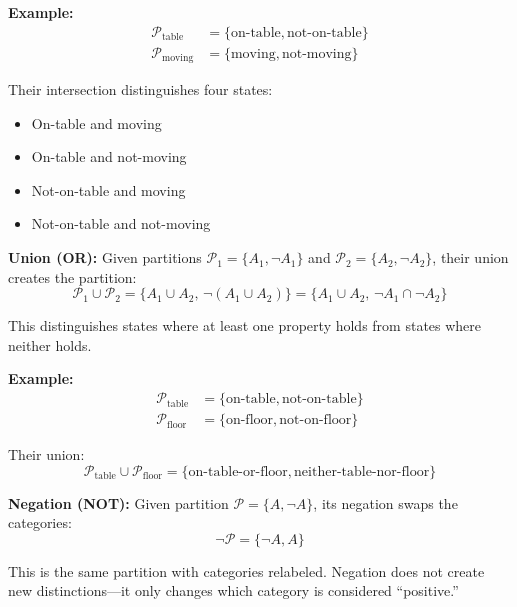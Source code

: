 \documentclass[twocolumn,10pt]{article}
\theoremstyle{definition}
\theoremstyle{remark}
\begin{document}
\vspace{0.2cm}
\noindent\textbf{Example:}
\begin{align}
\mathcal{P}_{\text{table}} &= \{\text{on-table}, \text{not-on-table}\} \\
\mathcal{P}_{\text{moving}} &= \{\text{moving}, \text{not-moving}\}
\end{align}

Their intersection distinguishes four states:
\begin{itemize}
\item On-table and moving
\item On-table and not-moving
\item Not-on-table and moving
\item Not-on-table and not-moving
\end{itemize}

\vspace{0.2cm}
\noindent\textbf{Union (OR):} Given partitions $\mathcal{P}_1 = \{A_1, \neg A_1\}$ and $\mathcal{P}_2 = \{A_2, \neg A_2\}$, their union creates the partition:
\begin{equation}
\mathcal{P}_1 \cup \mathcal{P}_2 = \{A_1 \cup A_2, \, \neg(A_1 \cup A_2)\} = \{A_1 \cup A_2, \, \neg A_1 \cap \neg A_2\}
\end{equation}

This distinguishes states where at least one property holds from states where neither holds.

\vspace{0.2cm}
\noindent\textbf{Example:}
\begin{align}
\mathcal{P}_{\text{table}} &= \{\text{on-table}, \text{not-on-table}\} \\
\mathcal{P}_{\text{floor}} &= \{\text{on-floor}, \text{not-on-floor}\}
\end{align}

Their union:
\begin{equation}
\mathcal{P}_{\text{table}} \cup \mathcal{P}_{\text{floor}} = \{\text{on-table-or-floor}, \text{neither-table-nor-floor}\}
\end{equation}

\vspace{0.2cm}
\noindent\textbf{Negation (NOT):} Given partition $\mathcal{P} = \{A, \neg A\}$, its negation swaps the categories:
\begin{equation}
\neg \mathcal{P} = \{\neg A, A\}
\end{equation}

This is the same partition with categories relabeled. Negation does not create new distinctions—it only changes which category is considered ``positive.''
\end{document}
